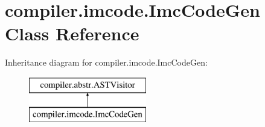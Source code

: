 \hypertarget{classcompiler_1_1imcode_1_1_imc_code_gen}{}\section{compiler.\+imcode.\+Imc\+Code\+Gen Class Reference}
\label{classcompiler_1_1imcode_1_1_imc_code_gen}
Inheritance diagram for compiler.\+imcode.\+Imc\+Code\+Gen\+:\begin{figure}[H]
\begin{center}
\leavevmode
\includegraphics[height=2.000000cm]{classcompiler_1_1imcode_1_1_imc_code_gen}
\end{center}
\end{figure}
